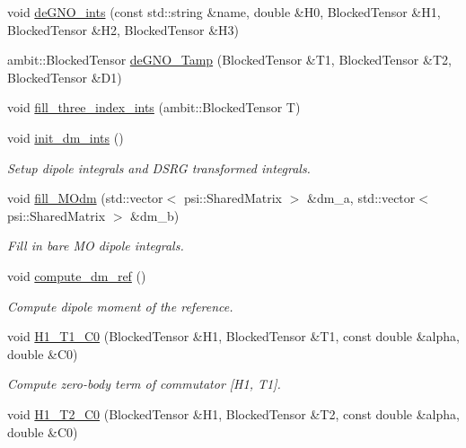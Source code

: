 \begin{DoxyCompactItemize}
\item 
void \mbox{\hyperlink{classforte_1_1_m_a_s_t_e_r___d_s_r_g_a48f26210aabd7ea4600205c75c2bf883}{de\+G\+N\+O\+\_\+ints}} (const std\+::string \&name, double \&H0, Blocked\+Tensor \&H1, Blocked\+Tensor \&H2, Blocked\+Tensor \&H3)
\item 
ambit\+::\+Blocked\+Tensor \mbox{\hyperlink{classforte_1_1_m_a_s_t_e_r___d_s_r_g_a5e59459adbaed7541848913a218471ac}{de\+G\+N\+O\+\_\+\+Tamp}} (Blocked\+Tensor \&T1, Blocked\+Tensor \&T2, Blocked\+Tensor \&D1)
\item 
void \mbox{\hyperlink{classforte_1_1_m_a_s_t_e_r___d_s_r_g_adbe5f4289f695a49b292caf2085ffbcf}{fill\+\_\+three\+\_\+index\+\_\+ints}} (ambit\+::\+Blocked\+Tensor T)
\item 
void \mbox{\hyperlink{classforte_1_1_m_a_s_t_e_r___d_s_r_g_a2ae6b6f7220ae5f12040ac2b97b21c3c}{init\+\_\+dm\+\_\+ints}} ()
\begin{DoxyCompactList}\small\item\em Setup dipole integrals and D\+S\+RG transformed integrals. \end{DoxyCompactList}\item 
void \mbox{\hyperlink{classforte_1_1_m_a_s_t_e_r___d_s_r_g_a7d865e9c13091a638fdc44a7a7b6ae43}{fill\+\_\+\+M\+Odm}} (std\+::vector$<$ psi\+::\+Shared\+Matrix $>$ \&dm\+\_\+a, std\+::vector$<$ psi\+::\+Shared\+Matrix $>$ \&dm\+\_\+b)
\begin{DoxyCompactList}\small\item\em Fill in bare MO dipole integrals. \end{DoxyCompactList}\item 
void \mbox{\hyperlink{classforte_1_1_m_a_s_t_e_r___d_s_r_g_ab7dcc4a5bdfc5694c4b4c29160456ed8}{compute\+\_\+dm\+\_\+ref}} ()
\begin{DoxyCompactList}\small\item\em Compute dipole moment of the reference. \end{DoxyCompactList}\item 
void \mbox{\hyperlink{classforte_1_1_m_a_s_t_e_r___d_s_r_g_a46cd12783b73049b758099d403abf194}{H1\+\_\+\+T1\+\_\+\+C0}} (Blocked\+Tensor \&H1, Blocked\+Tensor \&T1, const double \&alpha, double \&C0)
\begin{DoxyCompactList}\small\item\em Compute zero-\/body term of commutator \mbox{[}H1, T1\mbox{]}. \end{DoxyCompactList}\item 
void \mbox{\hyperlink{classforte_1_1_m_a_s_t_e_r___d_s_r_g_aaf832988d33d384cafc0d1539160cadb}{H1\+\_\+\+T2\+\_\+\+C0}} (Blocked\+Tensor \&H1, Blocked\+Tensor \&T2, const double \&alpha, double \&C0)

\end{DoxyCompactItemize}
